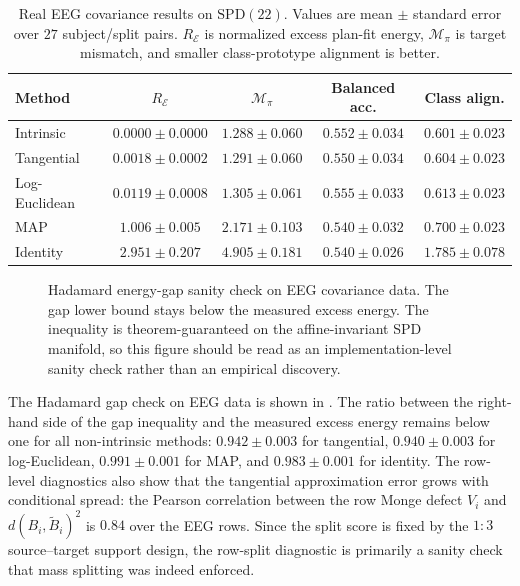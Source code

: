 \documentclass[10pt]{article} %
\theoremstyle{definition}
\providecommand{\1}{\mathbf{1}}
\begin{document}
\begin{table}[t]
\caption{Real EEG covariance results on $\mathrm{SPD}(22)$. Values are mean $\pm$ standard error over $27$ subject/split pairs. $R_{\mathcal E}$ is normalized excess plan-fit energy, $\mathcal M_\pi$ is target mismatch, and smaller class-prototype alignment is better.}
\label{tab:eeg-results}
\centering
\small
\begin{tabular}{lcccc}
\toprule
Method & $R_{\mathcal E}$ & $\mathcal M_\pi$ & Balanced acc. & Class align. \\
\midrule
Intrinsic & $0.0000\pm0.0000$ & $1.288\pm0.060$ & $0.552\pm0.034$ & $0.601\pm0.023$ \\
Tangential & $0.0018\pm0.0002$ & $1.291\pm0.060$ & $0.550\pm0.034$ & $0.604\pm0.023$ \\
Log-Euclidean & $0.0119\pm0.0008$ & $1.305\pm0.061$ & $0.555\pm0.033$ & $0.613\pm0.023$ \\
MAP & $1.006\pm0.005$ & $2.171\pm0.103$ & $0.540\pm0.032$ & $0.700\pm0.023$ \\
Identity & $2.951\pm0.207$ & $4.905\pm0.181$ & $0.540\pm0.026$ & $1.785\pm0.078$ \\
\bottomrule
\end{tabular}
\end{table}

\begin{figure}[t]
\centering
\resizebox{0.98\linewidth}{!}{%
	
}
\caption{Hadamard energy-gap sanity check on EEG covariance data. The gap lower bound stays below the measured excess energy. The inequality is theorem-guaranteed on the affine-invariant SPD manifold, so this figure should be read as an implementation-level sanity check rather than an empirical discovery.}
\label{fig:eeg-gap}
\end{figure}

The Hadamard gap check on EEG data is shown in . The ratio between the right-hand side of the gap inequality and the measured excess energy remains below one for all non-intrinsic methods: $0.942\pm0.003$ for tangential, $0.940\pm0.003$ for log-Euclidean, $0.991\pm0.001$ for MAP, and $0.983\pm0.001$ for identity. The row-level diagnostics also show that the tangential approximation error grows with conditional spread: the Pearson correlation between the row Monge defect $V_i$ and $d(B_i,\widetilde B_i)^2$ is $0.84$ over the EEG rows. Since the split score is fixed by the $1{:}3$ source--target support design, the row-split diagnostic is primarily a sanity check that mass splitting was indeed enforced.
\end{document}
